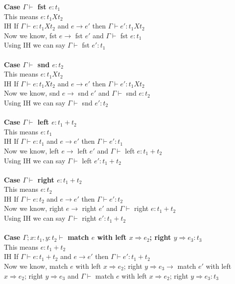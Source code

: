 \documentclass{article}
\begin{document}
\textbf{Case $\Gamma \vdash$ fst $e : t_1$ } \\
This means $e : t_1Xt_2$ \\
IH If $\Gamma \vdash e : t_1Xt_2$ and  $e \to e'$ then $\Gamma \vdash e' : t_1Xt_2$ \\
Now we know, fst $e \to$ fst $e'$ and $\Gamma \vdash$ fst $e : t_1$ \\
Using IH we can say $\Gamma \vdash$ fst $ e' : t_1$ \\\\
\textbf{Case $\Gamma \vdash$ snd $e : t_2$ } \\
This means $e : t_1Xt_2$ \\
IH If $\Gamma \vdash e : t_1Xt_2$ and  $e \to e'$ then $\Gamma \vdash e' : t_1Xt_2$ \\
Now we know, snd $e \to$ snd $e'$ and $\Gamma \vdash$ snd $e : t_2$ \\
Using IH we can say $\Gamma \vdash$ snd $ e' : t_2$ \\\\
\textbf{Case $\Gamma \vdash$ left $e : t_1+t_2$ } \\
This means $e : t_1$ \\
IH If $\Gamma \vdash e : t_1$ and  $e \to e'$ then $\Gamma \vdash e' : t_1$ \\
Now we know, left $e \to$ left $e'$ and $\Gamma \vdash$ left $e : t_1+t_2$ \\
Using IH we can say $\Gamma \vdash$ left $ e' : t_1+t_2$ \\\\
\textbf{Case $\Gamma \vdash$ right $e : t_1+t_2$ } \\
This means $e : t_2$ \\
IH If $\Gamma \vdash e : t_2$ and  $e \to e'$ then $\Gamma \vdash e' : t_2$ \\
Now we know, right $e \to$ right $e'$ and $\Gamma \vdash$ right $e : t_1+t_2$ \\
Using IH we can say $\Gamma \vdash$ right $ e' : t_1+t_2$ \\
\\
\textbf{Case $\Gamma; x: t_1, y: t_2 \vdash$ match $e$ with left $x \Rightarrow e_2 $; right $ y \Rightarrow e_3 : t_3$ } \\
This means $e : t_1 + t_2$ \\
IH If $\Gamma \vdash e : t_1+t_2$ and  $e \to e'$ then $\Gamma \vdash e' : t_1+t_2$ \\
Now we know, match $e$ with left $x \Rightarrow e_2 $; right $ y \Rightarrow e_3 \to$
match $e'$ with left $x \Rightarrow e_2 $; right $ y \Rightarrow e_3$ and $\Gamma \vdash$ match $e$ with left $x \Rightarrow e_2 $; right $ y \Rightarrow e_3 : t_3$ \\
\end{document}
